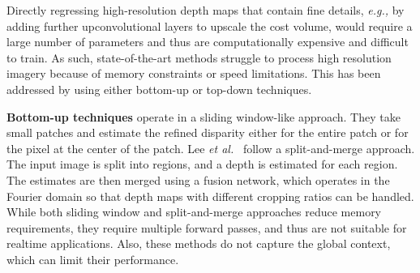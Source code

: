 \documentclass[10pt,journal,compsoc]{IEEEtran}
\newcommand{\eg}{\emph{e.g., }}
\newcommand{\etal}{\emph{et al.}}
\begin{document}
Directly regressing high-resolution depth maps that contain fine details, \eg by adding further upconvolutional layers  to upscale the cost volume, would require a large number of parameters and thus are computationally expensive and difficult to train.  As such, state-of-the-art methods struggle to process high resolution imagery because of memory constraints or speed limitations. This has been addressed  by using either bottom-up or top-down techniques.

\textbf{Bottom-up techniques}  operate in a sliding window-like approach. They take small patches and estimate the refined disparity either for the entire patch or for the pixel at the center of the patch.  Lee \etal~\cite{Lee_2018_CVPR} follow a split-and-merge approach. The input image is split  into regions, and a depth is estimated for each region. The estimates are then merged using a fusion network, which operates in the Fourier domain so that depth maps with different cropping ratios can be handled. While both sliding window and split-and-merge approaches reduce memory requirements, they require multiple forward passes, and thus are not suitable for realtime applications. Also, these methods do not capture the global context, which can limit their performance.
\end{document}
